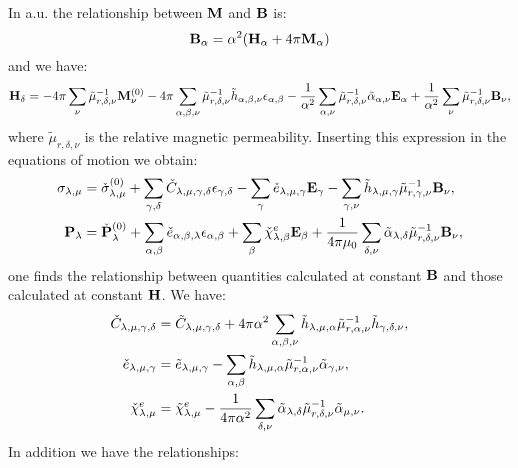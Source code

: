 \documentclass[12pt,a4paper,twoside]{report}
\begin{document}
{\color{web-blue}
In a.u. the relationship between ${\bf M}$ and ${\bf B}$ is:
\begin{equation}
{\bf B}_\alpha= \alpha^2 ({\bf H}_\alpha+4 \pi {\bf M}_\alpha)
\end{equation}
and we have:
\begin{equation}
{\bf H}_\delta = - 4 \pi \sum_\nu \tilde \mu^{-1}_{r,\delta,\nu} 
{\bf M}^{(0)}_\nu
- 4 \pi \sum_{\alpha,\beta,\nu} \tilde \mu^{-1}_{r,\delta,\nu} 
\tilde h_{\alpha,\beta,\nu}
\epsilon_{\alpha,\beta} - {1\over \alpha^2} \sum_{\alpha,\nu}
\tilde \mu^{-1}_{r,\delta,\nu} \tilde \alpha_{\alpha,\nu} {\bf E}_\alpha
+ {1\over \alpha^2} \sum_\nu \tilde \mu^{-1}_{r,\delta,\nu} {\bf B}_\nu, 
\end{equation}
where $\tilde \mu_{r,\delta,\nu}$ is the relative magnetic
permeability.
Inserting this expression in the equations of motion we obtain:
\begin{align}
\sigma_{\lambda,\mu}&= \check \sigma_{\lambda,\mu}^{(0)}
+\sum_{\gamma,\delta} \check C_{\lambda,\mu,\gamma,\delta}  
\epsilon_{\gamma,\delta} -
\sum_{\gamma} \check e_{\lambda,\mu,\gamma} 
 {\bf E}_{\gamma}
-\sum_{\gamma,\nu}  \tilde h_{\lambda,\mu,\gamma} 
\tilde \mu^{-1}_{r,\gamma,\nu} {\bf B}_{\nu}, \\
{\bf P}_{\lambda}&= \check {\bf P}^{(0)}_{\lambda}
+\sum_{\alpha,\beta} \check e_{\alpha,\beta,\lambda} 
\epsilon_{\alpha,\beta} +
\sum_{\beta} 
\check \chi^e_{\lambda,\beta}
{\bf E}_{\beta} +
{1\over 4 \pi \mu_0}\sum_{\delta,\nu} \tilde \alpha_{\lambda,\delta} 
\tilde \mu^{-1}_{r,\delta,\nu}  
{\bf B}_{\nu}, 
\end{align}
one finds the relationship between quantities calculated at constant 
${\bf B}$ and those calculated at constant ${\bf H}$. We have:
\begin{align}
\check C_{\lambda,\mu,\gamma,\delta} &=
\tilde C_{\lambda,\mu,\gamma,\delta} + 4 \pi \alpha^2 \sum_{\alpha,\beta,\nu}
\tilde h_{\lambda,\mu,\alpha} \tilde \mu^{-1}_{r,\alpha,\nu} 
\tilde h_{\gamma,\delta,\nu}, \\
\check e_{\lambda,\mu,\gamma}&= \tilde e_{\lambda,\mu,\gamma}
- \sum_{\alpha,\beta} \tilde h_{\lambda,\mu,\alpha} 
\tilde \mu^{-1}_{r,\alpha,\nu}
\tilde \alpha_{\gamma,\nu}, \\
\check \chi^e_{\lambda,\mu}&= \tilde \chi^e_{\lambda,\mu}
-{1\over 4 \pi \alpha^2} \sum_{\delta,\nu} \tilde \alpha_{\lambda,\delta} 
\tilde \mu^{-1}_{r,\delta,\nu} \tilde \alpha_{\mu,\nu}. 
\end{align}
In addition we have the relationships:
}
\end{document}
